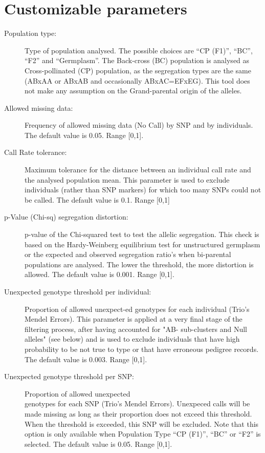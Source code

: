 \documentclass[a4paper,11pt,english]{article}
\begin{document}
\section{Customizable parameters}
\label{index:customizable-parameters}
\begin{description}
 \item [Population type:] Type of population analysed. The possible choices are ``CP
(F1)'', ``BC'', ``F2''
and ``Germplasm''. The Back-cross (BC) population is analysed as Cross-pollinated (CP) population,
as the segregation types are the same (ABxAA or ABxAB and occasionally ABxAC=EFxEG). This tool does
not make any assumption on the Grand-parental origin of the alleles.

\item [Allowed missing data:] Frequency of allowed missing data (No Call) by SNP and by
individuals.
The default value is 0.05. Range {[}0,1{]}.

\item [Call Rate tolerance:]  Maximum tolerance for the  distance between an individual
call rate and
the analysed population mean. This parameter is used to exclude individuals (rather than SNP
markers)
for which too many SNPs could not be called. The default value is 0.1. Range {[}0,1{]}

\item [p-Value (Chi-sq) segregation distortion:] p-value of the Chi-squared test to test
the allelic segregation. This check is based on the Hardy-Weinberg equilibrium test for
unstructured germplasm or the expected and observed segregation ratio's when bi-parental
populations are
analysed. The lower the threshold, the more distortion is allowed.
The default value is 0.001. Range {[}0,1{]}.

\item [Unexpected genotype threshold per individual:] Proportion of allowed unexpect-ed genotypes
for each individual (Trio's Mendel Errors). This parameter is applied at a very
final stage of the filtering process, after having accounted for "AB-
sub-clusters and Null alleles" (see below) and is used to exclude 
individuals that have high probability to be not true to type or that 
have erroneous pedigree records.
The default value is 0.003. Range {[}0,1{]}.

\item [Unexpected genotype threshold per SNP:] Proportion of allowed unexpected \\genotypes for each
SNP (Trio's Mendel Errors). Unexpeced calls will be made missing as long as their proportion does
not exceed this threshold. When the threshold is exceeded, this SNP will be excluded. Note that this
option is only available when Population Type ``CP
(F1)'', ``BC'' or ``F2'' is selected. The default value is 0.05. Range {[}0,1{]}.


\end{description}
\end{document}

